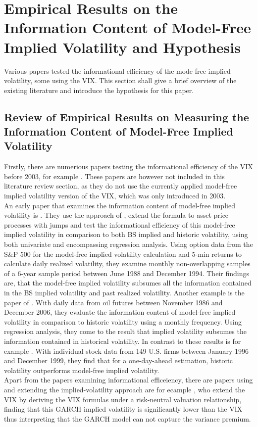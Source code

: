 
\section{Empirical Results on the Information Content of Model-Free Implied Volatility and Hypothesis}\label{sec:3Literature}
Various papers tested the informational efficiency of the mode-free implied volatility, some using the VIX. This section shall give a brief overview of the existing literature and introduce the hypothesis for this paper.

\subsection{Review of Empirical Results on Measuring the Information Content of Model-Free Implied Volatility}\label{sec:31LiteratureResults}

Firstly, there are numerious papers testing the informational efficiency of the VIX before 2003, for example \textcite{blair2001}. These papers are however not included in this literature review section, as they do not use the currently applied model-free implied volatility version of the VIX, which was only introduced in 2003. \\
An early paper that examines the information content of model-free implied volatility is \textcite{jiang2003}. They use the approach of \textcite{britten2000}, extend the formula to asset price processes with jumps and test the informational efficiency of this model-free implied volatility in comparison to both \gls{BS} implied and historic volatility, using both univariate and encompassing regression analysis. Using option data from the S\&P 500 for the model-free implied volatility calculation and 5-min returns to calculate daily realized volatility, they examine monthly non-overlapping samples of a 6-year sample period between June 1988 and December 1994. Their findings are, that the model-free implied volatility subsumes all the information contained in the \gls{BS} implied volatility and past realized volatility. Another example is the paper of \textcite{bakanove2010}. With daily data from oil futures between November 1986 and December 2006, they evaluate the information content of model-free implied volatility in comparison to historic volatility using a monthly frequency. 
Using regression analysis, they come to the result that implied volatility subsumes the information contained in historical volatility. In contrast to these results is for example \textcite{taylor2010}. With individual stock data from 149 U.S. firms between January 1996 and December 1999, they find that for a one-day-ahead estimation, historic volatility outperforms model-free implied volatility. \\
Apart from the papers examining informational efficeiency, there are  papers using and extending the implied-volatility approach are for ecample \textcite{hao2013}, who extend the VIX by deriving the VIX formulas under a risk-neutral valuation relationship, finding that this GARCH implied volatility is significantly lower than the VIX thus interpreting that the GARCH model can not capture the variance premium. \\



